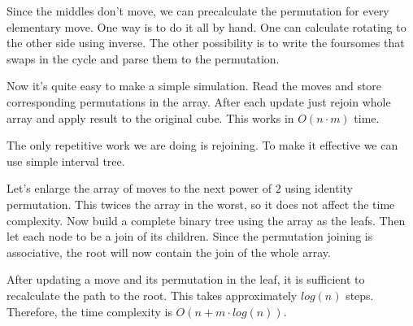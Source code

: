 \smallskip

Since the middles don't move, we can precalculate
the permutation for every elementary move. One way is
to do it all by hand. One can calculate rotating to
the other side using inverse. The other possibility is
to  write the foursomes that swaps in the cycle
and parse them to the permutation.

\smallskip

Now it's quite easy to make a simple simulation.
Read the moves and store corresponding permutations
in the array. After each update just rejoin whole
array and apply result to the original cube.
This works in $O(n \cdot m)$ time.


The only repetitive work we are doing is rejoining.
To make it effective we can use simple interval tree.

\smallskip

Let's enlarge the array of moves to the next
power of $2$ using identity permutation.
This twices the array in the worst, so it does not
affect the time complexity. Now build a complete
binary tree using the array as the leafs. Then let
each node to be a join of its children. Since
the permutation joining is associative, the root
will now contain the join of the whole array.

\smallskip

After updating a move and its permutation in the leaf,
it is sufficient to recalculate the path to the root.
This takes approximately $log(n)$ steps.
Therefore, the time complexity is $O(n + m \cdot log(n))$.
